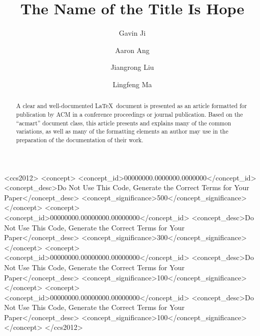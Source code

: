 \documentclass[sigplan,screen]{acmart}
\begin{document}
\small
\title{The Name of the Title Is Hope}

\author{Gavin Ji}
 
\author{Aaron Ang}



\author{Jiangrong Liu}


\author{Lingfeng Ma}
  



\renewcommand{\shortauthors}{Trovato et al.}

\begin{abstract}
  A clear and well-documented \LaTeX\ document is presented as an
  article formatted for publication by ACM in a conference proceedings
  or journal publication. Based on the ``acmart'' document class, this
  article presents and explains many of the common variations, as well
  as many of the formatting elements an author may use in the
  preparation of the documentation of their work.
\end{abstract}

\begin{CCSXML}
<ccs2012>
 <concept>
  <concept_id>00000000.0000000.0000000</concept_id>
  <concept_desc>Do Not Use This Code, Generate the Correct Terms for Your Paper</concept_desc>
  <concept_significance>500</concept_significance>
 </concept>
 <concept>
  <concept_id>00000000.00000000.00000000</concept_id>
  <concept_desc>Do Not Use This Code, Generate the Correct Terms for Your Paper</concept_desc>
  <concept_significance>300</concept_significance>
 </concept>
 <concept>
  <concept_id>00000000.00000000.00000000</concept_id>
  <concept_desc>Do Not Use This Code, Generate the Correct Terms for Your Paper</concept_desc>
  <concept_significance>100</concept_significance>
 </concept>
 <concept>
  <concept_id>00000000.00000000.00000000</concept_id>
  <concept_desc>Do Not Use This Code, Generate the Correct Terms for Your Paper</concept_desc>
  <concept_significance>100</concept_significance>
 </concept>
</ccs2012>
\end{CCSXML}
\end{document}
